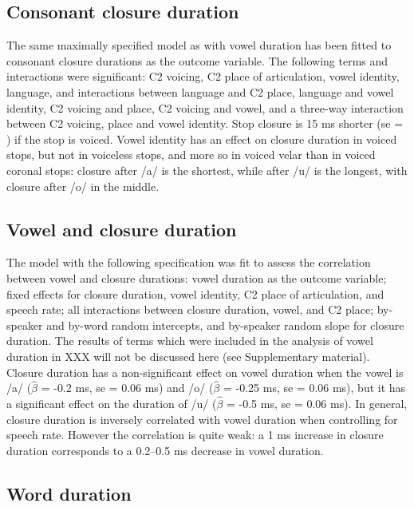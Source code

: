 \documentclass[]{JASAnew}
\begin{document}
\hypertarget{consonant-closure-duration}{%
\subsection{Consonant closure
duration}\label{consonant-closure-duration}}

The same maximally specified model as with vowel duration has been
fitted to consonant closure durations as the outcome variable. The
following terms and interactions were significant: C2 voicing, C2 place
of articulation, vowel identity, language, and interactions between
language and C2 place, language and vowel identity, C2 voicing and
place, C2 voicing and vowel, and a three-way interaction between C2
voicing, place and vowel identity. Stop closure is 15 ms shorter (se = )
if the stop is voiced. Vowel identity has an effect on closure duration
in voiced stops, but not in voiceless stops, and more so in voiced velar
than in voiced coronal stops: closure after /a/ is the shortest, while
after /u/ is the longest, with closure after /o/ in the middle.

\hypertarget{vowel-and-closure-duration}{%
\subsection{Vowel and closure
duration}\label{vowel-and-closure-duration}}

The model with the following specification was fit to assess the
correlation between vowel and closure durations: vowel duration as the
outcome variable; fixed effects for closure duration, vowel identity, C2
place of articulation, and speech rate; all interactions between closure
duration, vowel, and C2 place; by-speaker and by-word random intercepts,
and by-speaker random slope for closure duration. The results of terms
which were included in the analysis of vowel duration in XXX will not be
discussed here (see Supplementary material). Closure duration has a
non-significant effect on vowel duration when the vowel is /a/
(\(\hat{\beta}\) = -0.2 ms, se = 0.06 ms) and /o/ (\(\hat{\beta}\) =
-0.25 ms, se = 0.06 ms), but it has a significant effect on the duration
of /u/ (\(\hat{\beta}\) = -0.5 ms, se = 0.06 ms). In general, closure
duration is inversely correlated with vowel duration when controlling
for speech rate. However the correlation is quite weak: a 1 ms increase
in closure duration corresponds to a 0.2--0.5 ms decrease in vowel
duration.

\hypertarget{word-duration}{%
\subsection{Word duration}\label{word-duration}}
\end{document}
